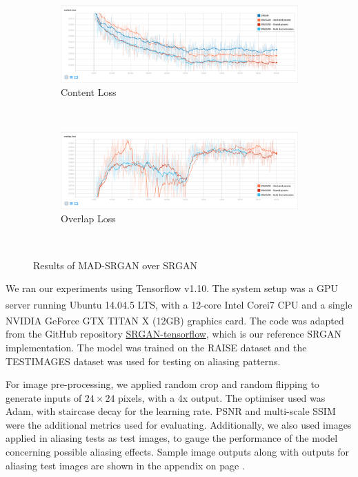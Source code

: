 \documentclass[12pt,a4paper]{article}
\begin{document}
\begin{multicols}{2}
\begin{figure}
\begin{subfigure}{0.48\textwidth}
                    \includegraphics[width=\textwidth]{images/cont-loss.png}
                    \caption{Content Loss}
                \end{subfigure}\\[5mm]
                \begin{subfigure}{0.48\textwidth}
                    \includegraphics[width=\textwidth]{images/ovrl-loss.png}
                    \caption{Overlap Loss}
                \end{subfigure}\\[2mm]
                \caption{Results of MAD-SRGAN over SRGAN}
                \label{fig:results}
            \end{figure}

            We ran our experiments using Tensorflow \cite{tensorflow} v1.10.
            The system setup was a GPU server running Ubuntu 14.04.5 LTS, with a 12-core Intel\textsuperscript{\textregistered} Core\texttrademark i7 CPU and a single NVIDIA GeForce\textsuperscript{\textregistered} GTX TITAN X (12GB) graphics card.
            The code was adapted from the GitHub repository \href{https://github.com/brade31919/SRGAN-tensorflow}{SRGAN-tensorflow}, which is our reference SRGAN implementation.
            The model was trained on the RAISE dataset \cite{raise} and the TESTIMAGES dataset \cite{testimages-1,testimages-2} was used for testing on aliasing patterns.

            For image pre-processing, we applied random crop and random flipping to generate inputs of $24 \times 24$ pixels, with a 4x output.
            The optimiser used was Adam, with staircase decay for the learning rate.
            PSNR and multi-scale SSIM \cite{msssim} were the additional metrics used for evaluating.
            Additionally, we also used images applied in aliasing tests as test images, to gauge the performance of the model concerning possible aliasing effects.
            Sample image outputs along with outputs for aliasing test images are shown in the appendix on page \pageref{samples}.


\end{multicols}
\end{document}
